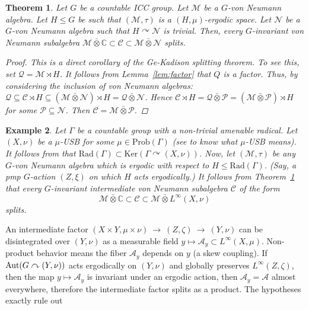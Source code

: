 \documentclass[12pt]{amsart}
\newcommand{\Aut}{{\rm Aut}}
\newtheorem{thm}{Theorem}[section]
\newtheorem{example}[thm]{Example}
\theoremstyle{definition}
\begin{document}
\begin{thm}
\label{thm:vnsplitting}
Let $G$ be a countable ICC group. Let $\mathcal{M}$ be a $G$-von Neumann algebra. Let $H\le G$ be such that $(\mathcal{M},\tau)$ is a $(H,\mu)$-ergodic space.  Let $\mathcal{N}$ be a $G$-von Neumann algebra such that $H\curvearrowright \mathcal{N}$ is trivial. Then, every $G$-invariant von Neumann subalgebra $\mathcal{M}\bar{\otimes} \mathbb{C}\subset\mathcal{C}\subset \mathcal{M}\bar{\otimes} \mathcal{N}$ splits. 
\begin{proof}
  This is a direct corollary of the Ge-Kadison splitting theorem. To see this, set $\mathcal{Q}=\mathcal{M}\rtimes H$. It follows from Lemma~\ref{lem:factor} that $Q$ is a factor. Thus, by considering the inclusion of von Neumann algebras: $\mathcal{Q}\subseteq \mathcal{C}\rtimes H\subseteq (\mathcal{M}\bar{\otimes} \mathcal{N})\rtimes H=\mathcal{Q}\bar{\otimes} \mathcal{N}$. Hence $\mathcal{C}\rtimes H=\mathcal{Q}\bar{\otimes} \mathcal{P}=(\mathcal{M}\bar{\otimes} \mathcal{P})\rtimes H$ for some $\mathcal{P}\subseteq \mathcal{N}$. Then $\mathcal{C}=\mathcal{M}\bar{\otimes} \mathcal{P}$.
\end{proof}
\end{thm}
\begin{example}
Let $\Gamma$ be a countable group with a non-trivial amenable radical. Let $(X,\nu)$ be a $\mu$-USB for some $\mu\in\text{Prob}(\Gamma)$ (see \cite[Definition~3.9]{HartKal} to know what $\mu$-USB means). It follows from \cite[Proposition~3.12]{HartKal} that $\text{Rad}(\Gamma)\subset\text{Ker}(\Gamma\curvearrowright(X,\nu))$. Now, let $(\mathcal{M},\tau)$ be any $G$-von Neumann algebra which is ergodic with respect to $H\le \text{Rad}(\Gamma)$. (Say, a pmp $G$-action $(Z,\xi)$ on which $H$ acts ergodically.) It follows from Theorem~\ref{thm:vnsplitting} that every $G$-invariant intermediate von Neumann subalgebra $\mathcal{C}$ of the form $$\mathcal{M}\bar{\otimes} \mathbb{C}\subset\mathcal{C}\subset \mathcal{M}\bar{\otimes} L^{\infty}(X,\nu)$$ splits.
\end{example}
An intermediate factor $(X\times Y,\mu\times\nu)\ \to\ (Z,\zeta)\ \to\ (Y,\nu)$
can be disintegrated over $(Y,\nu)$ as a measurable field $y\mapsto\mathcal A_y\subset L^\infty(X,\mu)$.
Non-product behavior means the fiber $\mathcal A_y$ depends on $y$ (a skew coupling).
If $\Aut(G\curvearrowright (Y,\nu))$ acts ergodically on $(Y,\nu)$ and globally preserves $L^\infty(Z,\zeta)$,
then the map $y\mapsto\mathcal A_y$ is invariant under an ergodic action, then
$\mathcal A_y=\mathcal A$ almost everywhere, therefore the intermediate factor splits as a product. The hypotheses exactly rule out
\end{document}
